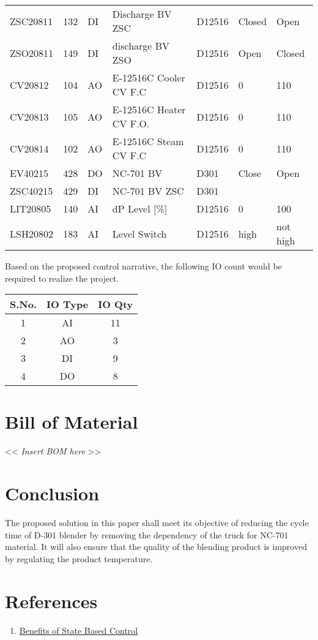 \documentclass[a4paper,oneside]{article}
\begin{document}
\begin{center}
\begin{tabular}{lllllll}
ZSC20811 & 132 & DI & Discharge BV ZSC & D12516 & Closed & Open\\
ZSO20811 & 149 & DI & discharge BV ZSO & D12516 & Open & Closed\\
CV20812 & 104 & AO & E-12516C Cooler CV F.C & D12516 & 0 & 110\\
CV20813 & 105 & AO & E-12516C Heater CV F.O. & D12516 & 0 & 110\\
CV20814 & 102 & AO & E-12516C Steam CV F.C & D12516 & 0 & 110\\
EV40215 & 428 & DO & NC-701 BV & D301 & Close & Open\\
ZSC40215 & 429 & DI & NC-701 BV ZSC & D301 &  & \\
LIT20805 & 140 & AI & dP Level [\%] & D12516 & 0 & 100\\
LSH20802 & 183 & AI & Level Switch & D12516 & high & not high\\
\end{tabular}
\end{center}

Based on the proposed control narrative, the following IO count would be required to realize the project. 
\begin{center}
\begin{tabular}{ccc}
S.No. & IO Type & IO Qty\\
\hline
1 & AI & 11\\
2 & AO & 3\\
3 & DI & 9\\
4 & DO & 8\\
\end{tabular}
\end{center}

\clearpage
\section{Bill of Material}
\label{sec:org5f990d2}
<< \emph{Insert BOM here} >>
\clearpage
\section{Conclusion}
\label{sec:org47cfd1e}
The proposed solution in this paper shall meet its objective of
reducing the cycle time of D-301 blender by removing the dependency of
the truck for NC-701 material. It will also ensure that the quality of
the blending product is improved by regulating the product
temperature.
\section{References}
\label{sec:org0b83c1c}
\begin{enumerate}
\item \href{https://www.controlglobal.com/assets/knowledge\_centers/abb/assets/Benefits-of-state-based-control-white-paper.pdf}{Benefits of State Based Control}
\end{enumerate}
\end{document}
